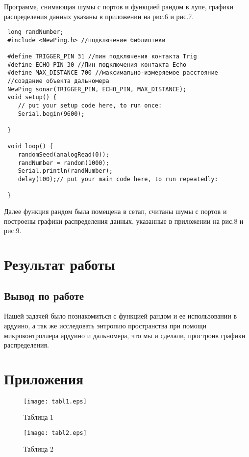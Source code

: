 \documentclass[12pt,a4paper]{scrartcl}
\begin{document}
 Программа, снимающая шумы с портов и функцией рандом в лупе, графики распределения данных указаны в приложении на рис.6 и рис.7. 
 \begin{verbatim} 
 long randNumber;
 #include <NewPing.h> //подключение библиотеки
 
 #define TRIGGER_PIN 31 //пин подключения контакта Trig
 #define ECHO_PIN 30 //Пин подключения контакта Echo
 #define MAX_DISTANCE 700 //максимально-измеряемое расстояние
 //создание объекта дальномера
 NewPing sonar(TRIGGER_PIN, ECHO_PIN, MAX_DISTANCE);
 void setup() {
 	// put your setup code here, to run once:
 	Serial.begin(9600);
 	
 }
 
 void loop() {
 	randomSeed(analogRead(0));
 	randNumber = random(1000);
 	Serial.println(randNumber);
 	delay(100);// put your main code here, to run repeatedly:
 	
 }
 \end{verbatim}
 
 Далее функция рандом была помещена в сетап, считаны шумы с портов и построены графики распределения данных, указанные в приложении на рис.8 и рис.9.
 \newpage
\section{Результат работы}

\subsection{Вывод по работе}
Нашей задачей было познакомиться с функцией рандом и ее использовании в ардуино, а так же исследовать энтропию пространства при помощи микроконтроллера ардуино и дальномера, что мы и сделали, простроив графики распределения. 

\section{Приложения}
 \begin{figure}[h!]  
	\centering
	\texttt{[image: tabl1.eps]} %
	\caption{Таблица 1} 
\end{figure}

 \begin{figure}[h!]  
	\centering
	\texttt{[image: tabl2.eps]} %
	\caption{Таблица 2} 

\end{figure}
\end{document}
